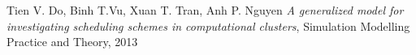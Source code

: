 \newpage
{}
\begin{thebibliography}{99}
	 Tien V. Do, Binh T.Vu, Xuan T. Tran, Anh P. Nguyen  {\it A generalized model for investigating scheduling schemes in computational clusters}, Simulation Modelling Practice and Theory, 2013
	  
\end{thebibliography}